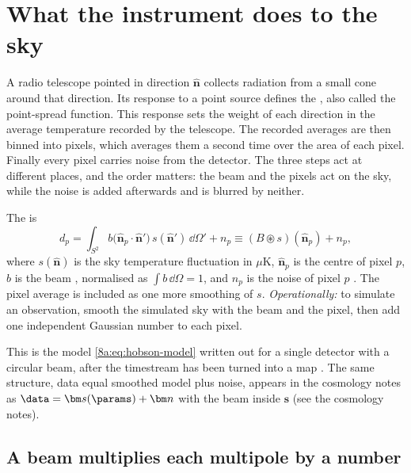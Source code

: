 \section{What the instrument does to the sky}
\label{8a:sec:model}

A radio telescope pointed in direction $\hat{\bm n}$ collects radiation
from a small cone around that direction. Its response to a point source
defines the , also called the point-spread function. This
response sets the weight of each direction in the average temperature
recorded by the telescope. The recorded averages are then binned into pixels, which
averages them a second time over the area of each pixel. Finally every pixel carries noise
from the detector. The three steps act at different places, and the order matters: the beam
and the pixels act on the sky, while the noise is added afterwards and is blurred by
neither.

\begin{workdef}
The  is
\begin{equation}
  d_p=\int_{S^2} b\bigl(\hat{\bm n}_p\cdot\hat{\bm n}'\bigr)\,s(\hat{\bm n}')\,\dd\Omega' + n_p
  \equiv (B\circledast s)(\hat{\bm n}_p)+n_p ,
  \label{8a:eq:obs-model}
\end{equation}
where $s(\hat{\bm n})$ is the sky temperature fluctuation in $\mu$K, $\hat{\bm n}_p$ is the
centre of pixel $p$, $b$ is the beam , normalised as $\int b\,\dd\Omega=1$, and $n_p$ is the noise of pixel $p$
. The pixel average is included as one more smoothing of $s$.
\emph{Operationally:} to simulate an observation, smooth the simulated sky with the beam and
the pixel, then add one independent Gaussian number to each pixel.
\end{workdef}

This is the model \eqref{8a:eq:hobson-model} written out for a single detector with a
circular beam, after the timestream has been turned into a map
. The same structure, data equal smoothed model plus
noise, appears in the cosmology notes as $\data=\bm s(\params)+\bm n$ with the beam inside
$\bm s$ (see the cosmology notes).

\subsection{A beam multiplies each multipole by a number}
\label{8a:sec:beam}

